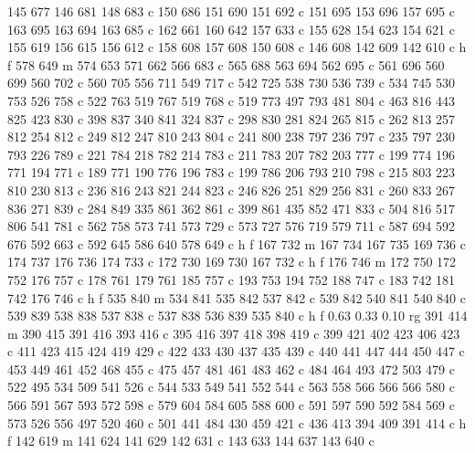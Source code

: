 {{        145 677 146 681 148 683 c
        150 686 151 690 151 692 c
        151 695 153 696 157 695 c
        163 695 163 694 163 685 c
        162 661 160 642 157 633 c
        155 628 154 623 154 621 c
        155 619 156 615 156 612 c
        158 608 157 608 150 608 c
        146 608 142 609 142 610 c
        h f
        578 649 m
        574 653 571 662 566 683 c
        565 688 563 694 562 695 c
        561 696 560 699 560 702 c
        560 705 556 711 549 717 c
        542 725 538 730 536 739 c
        534 745 530 753 526 758 c
        522 763 519 767 519 768 c
        519 773 497 793 481 804 c
        463 816 443 825 423 830 c
        398 837 340 841 324 837 c
        298 830 281 824 265 815 c
        262 813 257 812 254 812 c
        249 812 247 810 243 804 c
        241 800 238 797 236 797 c
        235 797 230 793 226 789 c
        221 784 218 782 214 783 c
        211 783 207 782 203 777 c
        199 774 196 771 194 771 c
        189 771 190 776 196 783 c
        199 786 206 793 210 798 c
        215 803 223 810 230 813 c
        236 816 243 821 244 823 c
        246 826 251 829 256 831 c
        260 833 267 836 271 839 c
        284 849 335 861 362 861 c
        399 861 435 852 471 833 c
        504 816 517 806 541 781 c
        562 758 573 741 573 729 c
        573 727 576 719 579 711 c
        587 694 592 676 592 663 c
        592 645 586 640 578 649 c
        h f
        167 732 m
        167 734 167 735 169 736 c
        174 737 176 736 174 733 c
        172 730 169 730 167 732 c
        h f
        176 746 m
        172 750 172 752 176 757 c
        178 761 179 761 185 757 c
        193 753 194 752 188 747 c
        183 742 181 742 176 746 c
        h f
        535 840 m
        534 841 535 842 537 842 c
        539 842 540 841 540 840 c
        539 839 538 838 537 838 c
        537 838 536 839 535 840 c
        h f
        0.63 0.33 0.10 rg
        391 414 m
        390 415 391 416 393 416 c
        395 416 397 418 398 419 c
        399 421 402 423 406 423 c
        411 423 415 424 419 429 c
        422 433 430 437 435 439 c
        440 441 447 444 450 447 c
        453 449 461 452 468 455 c
        475 457 481 461 483 462 c
        484 464 493 472 503 479 c
        522 495 534 509 541 526 c
        544 533 549 541 552 544 c
        563 558 566 566 566 580 c
        566 591 567 593 572 598 c
        579 604 584 605 588 600 c
        591 597 590 592 584 569 c
        573 526 556 497 520 460 c
        501 441 484 430 459 421 c
        436 413 394 409 391 414 c
        h f
        142 619 m
        141 624 141 629 142 631 c
        143 633 144 637 143 640 c
}}
